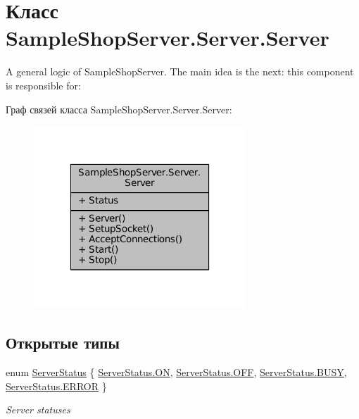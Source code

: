 \hypertarget{class_sample_shop_server_1_1_server_1_1_server}{}\section{Класс Sample\+Shop\+Server.\+Server.\+Server}
\label{class_sample_shop_server_1_1_server_1_1_server}


A general logic of Sample\+Shop\+Server. The main idea is the next\+: this component is responsible for\+:  




Граф связей класса Sample\+Shop\+Server.\+Server.\+Server\+:
\nopagebreak
\begin{figure}[H]
\begin{center}
\leavevmode
\includegraphics[width=226pt]{class_sample_shop_server_1_1_server_1_1_server__coll__graph}
\end{center}
\end{figure}
\subsection*{Открытые типы}
\begin{DoxyCompactItemize}
\item 
enum \hyperlink{class_sample_shop_server_1_1_server_1_1_server_a0b89d20b2f19ee5580acbbc73887bb6b}{Server\+Status} \{ \hyperlink{class_sample_shop_server_1_1_server_1_1_server_a0b89d20b2f19ee5580acbbc73887bb6ba90651ebea9a35ec4e018c8157492e17c}{Server\+Status.\+O\+N}, 
\hyperlink{class_sample_shop_server_1_1_server_1_1_server_a0b89d20b2f19ee5580acbbc73887bb6ba88559a0cfd8250c9d65970cc145c92d4}{Server\+Status.\+O\+F\+F}, 
\hyperlink{class_sample_shop_server_1_1_server_1_1_server_a0b89d20b2f19ee5580acbbc73887bb6ba802706a9238e2928077f97736854bad4}{Server\+Status.\+B\+U\+S\+Y}, 
\hyperlink{class_sample_shop_server_1_1_server_1_1_server_a0b89d20b2f19ee5580acbbc73887bb6babb1ca97ec761fc37101737ba0aa2e7c5}{Server\+Status.\+E\+R\+R\+O\+R}
 \}\begin{DoxyCompactList}\small\item\em Server statuses \end{DoxyCompactList}
\end{DoxyCompactItemize}
